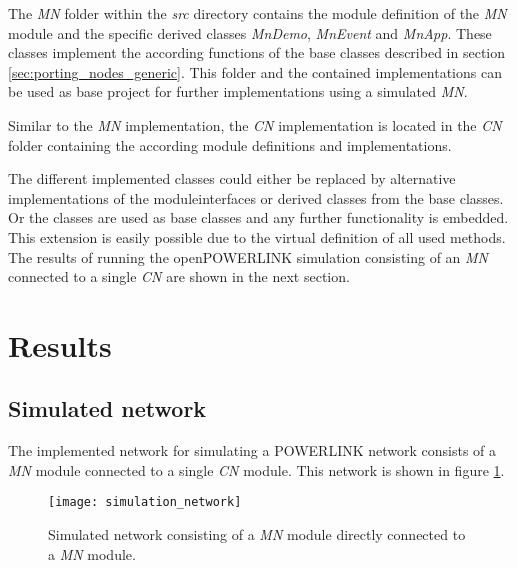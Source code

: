 The \emph{MN} folder within the \emph{src} directory contains the module definition of the \emph{MN} module and the specific derived classes \emph{MnDemo}, \emph{MnEvent} and \emph{MnApp}.
These classes implement the according functions of the base classes described in section \ref{sec:porting_nodes_generic}.
This folder and the contained implementations can be used as base project for further implementations using a simulated \emph{MN}.

Similar to the \emph{MN} implementation, the \emph{CN} implementation is located in the \emph{CN} folder containing the according module definitions and implementations.

The different implemented classes could either be replaced by alternative implementations of the moduleinterfaces or derived classes from the base classes.
Or the classes are used as base classes and any further functionality is embedded.
This extension is easily possible due to the virtual definition of all used methods.
\\

The results of running the openPOWERLINK simulation consisting of an \emph{MN} connected to a single \emph{CN} are shown in the next section.

\section{Results}
\label{sec:porting_results}

\subsection{Simulated network}
\label{sec:porting_results_network}
The implemented network for simulating a POWERLINK network consists of a \emph{MN} module connected to a single \emph{CN} module.
This network is shown in figure \ref{fig:simulation_network}.

\begin{figure}
    \centering
    \texttt{[image: simulation\_network]}
    \caption{Simulated network consisting of a \emph{MN} module directly connected to a \emph{MN} module.}
    \label{fig:simulation_network}
\end{figure}